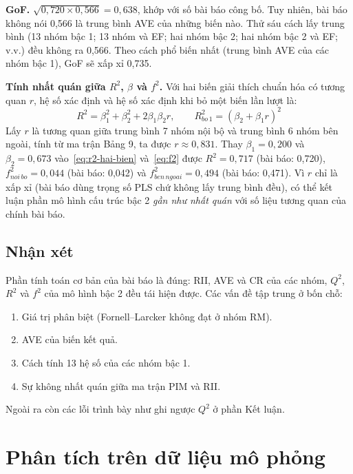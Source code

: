 \textbf{GoF.} $\sqrt{0{,}720 \times 0{,}566} = 0{,}638$, khớp với số bài báo công bố. Tuy nhiên, bài báo không nói 0,566 là trung bình AVE của những biến nào. Thử sáu cách lấy trung bình (13 nhóm bậc 1; 13 nhóm và EF; hai nhóm bậc 2; hai nhóm bậc 2 và EF; v.v.) đều không ra 0,566. Theo cách phổ biến nhất (trung bình AVE của các nhóm bậc 1), GoF sẽ xấp xỉ 0,735.

\textbf{Tính nhất quán giữa $R^2$, $\beta$ và $f^2$.} Với hai biến giải thích chuẩn hóa có tương quan $r$, hệ số xác định và hệ số xác định khi bỏ một biến lần lượt là:
\begin{equation}
R^2 = \beta_1^2 + \beta_2^2 + 2\beta_1\beta_2 r, \qquad R^2_{bo\,1} = (\beta_2 + \beta_1 r)^2
\label{eq:r2-hai-bien}
\end{equation}
Lấy $r$ là tương quan giữa trung bình 7 nhóm nội bộ và trung bình 6 nhóm bên ngoài, tính từ ma trận Bảng 9, ta được $r \approx 0{,}831$. Thay $\beta_1 = 0{,}200$ và $\beta_2 = 0{,}673$ vào~\eqref{eq:r2-hai-bien} và~\eqref{eq:f2} được $R^2 = 0{,}717$ (bài báo: 0,720), $f^2_{noi\,bo} = 0{,}044$ (bài báo: 0,042) và $f^2_{ben\,ngoai} = 0{,}494$ (bài báo: 0,471). Vì $r$ chỉ là xấp xỉ (bài báo dùng trọng số PLS chứ không lấy trung bình đều), có thể kết luận phần mô hình cấu trúc bậc 2 \emph{gần như nhất quán} với số liệu tương quan của chính bài báo.

\subsection{Nhận xét}

Phần tính toán cơ bản của bài báo là đúng: RII, AVE và CR của các nhóm, $Q^2$, $R^2$ và $f^2$ của mô hình bậc 2 đều tái hiện được. Các vấn đề tập trung ở bốn chỗ:
\begin{enumerate}
  \item Giá trị phân biệt (Fornell--Larcker không đạt ở nhóm RM).
  \item AVE của biến kết quả.
  \item Cách tính 13 hệ số của các nhóm bậc 1.
  \item Sự không nhất quán giữa ma trận PIM và RII.
\end{enumerate}
Ngoài ra còn các lỗi trình bày như ghi ngược $Q^2$ ở phần Kết luận.

\section{Phân tích trên dữ liệu mô phỏng}
\label{sec:mo-phong}


